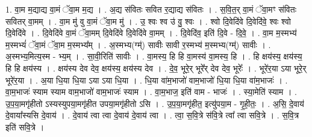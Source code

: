 \documentclass[17pt]{extarticle}
\begin{document}
1. वा॒म म॒द्याद्य वा॒मं ॅवा॒म म॒द्य । . अ॒द्य स॑वितः सवित र॒द्याद्य स॑वितः । . स॒वि॒त॒र् वा॒मं ॅवा॒मꣳ स॑वितः सवितर् वा॒मम् । . वा॒म मु॑ वु वा॒मं ॅवा॒म मु॑ । . उ॒ श्वः श्व उ॑ वु॒ श्वः । . श्वो दि॒वेदि॑वे दि॒वेदि॑वे॒ श्वः श्वो दि॒वेदि॑वे । . दि॒वेदि॑वे वा॒मं ॅवा॒मम् दि॒वेदि॑वे दि॒वेदि॑वे वा॒मम् । . दि॒वेदि॑व॒ इति॑ दि॒वे - दि॒वे॒ । . वा॒म म॒स्मभ्य॑ म॒स्मभ्यं॑ ॅवा॒मं ॅवा॒म म॒स्मभ्य᳚म् । . अ॒स्मभ्य(ग्म्॑) सावीः सावी र॒स्मभ्य॑ म॒स्मभ्य(ग्म्॑) सावीः । . अ॒स्मभ्य॒मित्य॒स्म - भ्य॒म् । . सा॒वी॒रिति॑ सावीः । . वा॒मस्य॒ हि हि वा॒मस्य॑ वा॒मस्य॒ हि । . हि क्षय॑स्य॒ क्षय॑स्य॒ हि हि क्षय॑स्य । . क्षय॑स्य देव देव॒ क्षय॑स्य॒ क्षय॑स्य देव । . दे॒व॒ भूरे॒र् भूरे᳚र् देव देव॒ भूरेः᳚ । . भूरे॑र॒या ऽया भूरे॒र् भूरे॑र॒या । . अ॒या धि॒या धि॒या ऽया ऽया धि॒या । . धि॒या वा॑म॒भाजो॑ वाम॒भाजो॑ धि॒या धि॒या वा॑म॒भाजः॑ । . वा॒म॒भाजः॑ स्याम स्याम वाम॒भाजो॑ वाम॒भाजः॑ स्याम । . वा॒म॒भाज॒ इति॑ वाम - भाजः॑ । . स्या॒मेति॑ स्याम । . उ॒प॒या॒मगृ॑हीतो ऽस्यस्युपया॒मगृ॑हीत उपया॒मगृ॑हीतो ऽसि । . उ॒प॒या॒मगृ॑हीत॒ इत्यु॑पया॒म - गृ॒ही॒तः॒ । . अ॒सि॒ दे॒वाय॑ दे॒वाया᳚स्यसि दे॒वाय॑ । . दे॒वाय॑ त्वा त्वा दे॒वाय॑ दे॒वाय॑ त्वा । . त्वा॒ स॒वि॒त्रे स॑वि॒त्रे त्वा᳚ त्वा सवि॒त्रे । . स॒वि॒त्र इति॑ सवि॒त्रे । \newline
\end{document}
